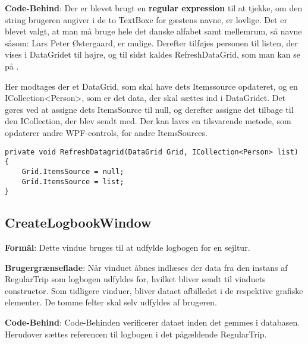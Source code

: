 \textbf{Code-Behind}: 
Der er blevet brugt en \textbf{regular expression} til at tjekke, om den string brugeren angiver i de to TextBoxe for gæstens navne, er lovlige. 
Det er blevet valgt, at man må bruge hele det danske alfabet samt mellemrum, så navne såsom: Lars Peter Østergaard, er mulige.
Derefter tilføjes personen til listen, der vises i DataGridet til højre, og til sidst kaldes RefreshDataGrid, som man kan se på .

Her modtages der et DataGrid, som skal have dets Itemssource opdateret, og en ICollection<Person>, som er det data, der skal sættes ind i DataGridet. 
Det gøres ved at assigne dets ItemsSource til null, og derefter assigne det tilbage til den ICollection, der blev sendt med. 
Der kan laves en tilsvarende metode, som opdaterer andre WPF-controls, for andre ItemsSources.

\begin{lstlisting}[frame=single, caption=Refresh Datagrid, label=RefreshDatagrid]
private void RefreshDatagrid(DataGrid Grid, ICollection<Person> list)
{
    Grid.ItemsSource = null;
    Grid.ItemsSource = list;
}
\end{lstlisting}

\subsection{CreateLogbookWindow}

\textbf{Formål}: 
Dette vindue bruges til at udfylde logbogen for en sejltur.

\textbf{Brugergrænseflade}:  
Når vinduet åbnes indlæses der data fra den instans af RegularTrip som logbogen udfyldes for, hvilket bliver sendt til vinduets constructor.
Som tidligere vinduer, bliver dataet afbilledet i de respektive grafiske elementer. 
De tomme felter skal selv udfyldes af brugeren. 

\textbf{Code-Behind}: 
Code-Behinden verificerer dataet inden det gemmes i databasen.
Herudover sættes referencen til logbogen i det pågældende RegularTrip.

